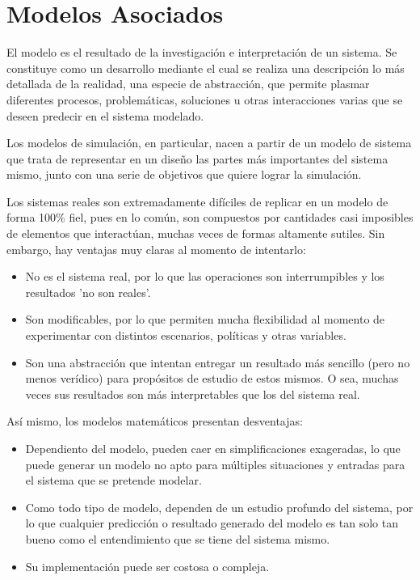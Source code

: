\section{Modelos Asociados}

El modelo es el resultado de la investigación e interpretación de un sistema. Se constituye como un desarrollo mediante el cual se realiza una descripción lo más detallada de la realidad, una especie de abstracción, que permite plasmar diferentes procesos, problemáticas, soluciones u otras interacciones varias que se deseen predecir en el sistema modelado.

Los modelos de simulación, en particular, nacen a partir de un modelo de sistema que trata de representar en un diseño las partes más importantes del sistema mismo, junto con una serie de objetivos que quiere lograr la simulación.

Los sistemas reales son extremadamente difíciles de replicar en un modelo de forma 100\% fiel, pues en lo común, son compuestos por cantidades casi imposibles de elementos que interactúan, muchas veces de formas altamente sutiles. Sin embargo, hay ventajas muy claras al momento de intentarlo:

\begin{itemize}
    \item No es el sistema real, por lo que las operaciones son interrumpibles y los resultados 'no son reales'.
    \item Son modificables, por lo que permiten mucha flexibilidad al momento de experimentar con distintos escenarios, políticas y otras variables.
    \item Son una abstracción que intentan entregar un resultado más sencillo (pero no menos verídico) para propósitos de estudio de estos mismos. O sea, muchas veces sus resultados son más interpretables que los del sistema real.
\end{itemize}

Así mismo, los modelos matemáticos presentan desventajas:

\begin{itemize}
    \item Dependiento del modelo, pueden caer en simplificaciones exageradas, lo que puede generar un modelo no apto para múltiples situaciones y entradas para el sistema que se pretende modelar.
    \item Como todo tipo de modelo, dependen de un estudio profundo del sistema, por lo que cualquier predicción o resultado generado del modelo es tan solo tan bueno como el entendimiento que se tiene del sistema mismo.
    \item Su implementación puede ser costosa o compleja.
\end{itemize}

